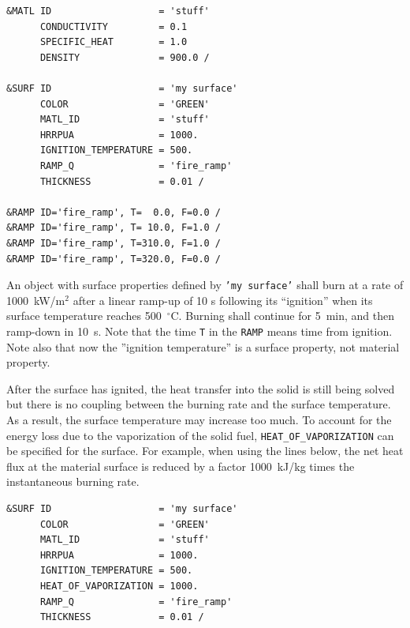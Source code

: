 \documentclass[11pt]{book}
\newcommand{\ct}{\tt\small}
\begin{document}
\footnotesize
\begin{verbatim}
&MATL ID                   = 'stuff'
      CONDUCTIVITY         = 0.1
      SPECIFIC_HEAT        = 1.0
      DENSITY              = 900.0 /

&SURF ID                   = 'my surface'
      COLOR                = 'GREEN'
      MATL_ID              = 'stuff'
      HRRPUA               = 1000.
      IGNITION_TEMPERATURE = 500.
      RAMP_Q               = 'fire_ramp'
      THICKNESS            = 0.01 /

&RAMP ID='fire_ramp', T=  0.0, F=0.0 /
&RAMP ID='fire_ramp', T= 10.0, F=1.0 /
&RAMP ID='fire_ramp', T=310.0, F=1.0 /
&RAMP ID='fire_ramp', T=320.0, F=0.0 /
\end{verbatim} \normalsize

\noindent
An object with surface properties defined by {\ct 'my surface'} shall
burn at a rate of 1000~kW/m$^2$ after a linear ramp-up of 10 s
following its ``ignition'' when its surface temperature reaches
500~$^\circ$C. Burning shall continue for 5~min, and then ramp-down
in 10~s. Note that the time {\ct T} in the {\ct RAMP} means time from
ignition. Note also that now the ''ignition temperature'' is a surface
property, not material property.

After the surface has ignited, the heat transfer into the solid is
still being solved but there is no coupling between the burning rate
and the surface temperature. As a result, the surface temperature may
increase too much. To account for the energy loss due to the
vaporization of the solid fuel, {\ct HEAT\_OF\_VAPORIZATION} can be
specified for the surface. For example, when using the lines below,
the net heat flux at the material surface is reduced by a factor
1000~kJ/kg times the instantaneous burning rate.

\footnotesize
\begin{verbatim}
&SURF ID                   = 'my surface'
      COLOR                = 'GREEN'
      MATL_ID              = 'stuff'
      HRRPUA               = 1000.
      IGNITION_TEMPERATURE = 500.
      HEAT_OF_VAPORIZATION = 1000.
      RAMP_Q               = 'fire_ramp'
      THICKNESS            = 0.01 /
\end{verbatim} \normalsize
\end{document}
